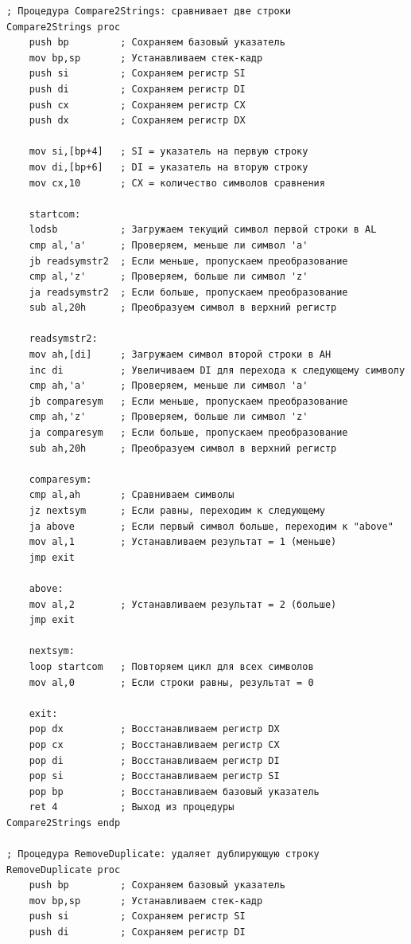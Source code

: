 \documentclass[a4paper,14pt]{article}
\begin{document}
\begin{lstlisting}
; Процедура Compare2Strings: сравнивает две строки
Compare2Strings proc
    push bp         ; Сохраняем базовый указатель
    mov bp,sp       ; Устанавливаем стек-кадр
    push si         ; Сохраняем регистр SI
    push di         ; Сохраняем регистр DI
    push cx         ; Сохраняем регистр CX
    push dx         ; Сохраняем регистр DX

    mov si,[bp+4]   ; SI = указатель на первую строку
    mov di,[bp+6]   ; DI = указатель на вторую строку
    mov cx,10       ; CX = количество символов сравнения

    startcom:
    lodsb           ; Загружаем текущий символ первой строки в AL
    cmp al,'a'      ; Проверяем, меньше ли символ 'a'
    jb readsymstr2  ; Если меньше, пропускаем преобразование
    cmp al,'z'      ; Проверяем, больше ли символ 'z'
    ja readsymstr2  ; Если больше, пропускаем преобразование
    sub al,20h      ; Преобразуем символ в верхний регистр

    readsymstr2:
    mov ah,[di]     ; Загружаем символ второй строки в AH
    inc di          ; Увеличиваем DI для перехода к следующему символу
    cmp ah,'a'      ; Проверяем, меньше ли символ 'a'
    jb comparesym   ; Если меньше, пропускаем преобразование
    cmp ah,'z'      ; Проверяем, больше ли символ 'z'
    ja comparesym   ; Если больше, пропускаем преобразование
    sub ah,20h      ; Преобразуем символ в верхний регистр

    comparesym:
    cmp al,ah       ; Сравниваем символы
    jz nextsym      ; Если равны, переходим к следующему
    ja above        ; Если первый символ больше, переходим к "above"
    mov al,1        ; Устанавливаем результат = 1 (меньше)
    jmp exit

    above:
    mov al,2        ; Устанавливаем результат = 2 (больше)	
    jmp exit

    nextsym:
    loop startcom   ; Повторяем цикл для всех символов
    mov al,0        ; Если строки равны, результат = 0

    exit:
    pop dx          ; Восстанавливаем регистр DX
    pop cx          ; Восстанавливаем регистр CX
    pop di          ; Восстанавливаем регистр DI
    pop si          ; Восстанавливаем регистр SI
    pop bp          ; Восстанавливаем базовый указатель
    ret 4           ; Выход из процедуры
Compare2Strings endp
    
; Процедура RemoveDuplicate: удаляет дублирующую строку
RemoveDuplicate proc
    push bp         ; Сохраняем базовый указатель
    mov bp,sp       ; Устанавливаем стек-кадр
    push si         ; Сохраняем регистр SI
    push di         ; Сохраняем регистр DI


\end{lstlisting}
\end{document}
